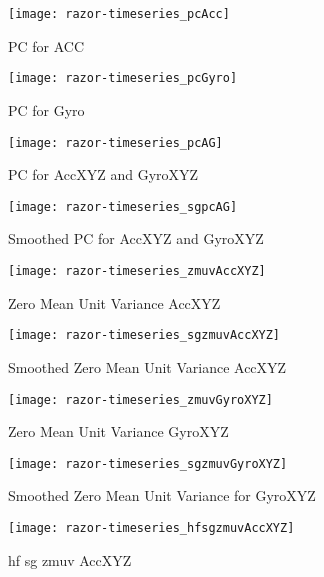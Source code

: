 \documentclass[a4paper,12pt]{article}
\begin{document}
\begin{figure}
\centering
\texttt{[image: razor-timeseries\_pcAcc]}
\caption{PC for ACC}
\end{figure}



\begin{figure}
\centering
\texttt{[image: razor-timeseries\_pcGyro]}
\caption{PC for Gyro}
\end{figure}



\begin{figure}
\centering
\texttt{[image: razor-timeseries\_pcAG]}
\caption{PC for AccXYZ and GyroXYZ}
\end{figure}

\begin{figure}
\centering
\texttt{[image: razor-timeseries\_sgpcAG]}
\caption{Smoothed PC for AccXYZ and GyroXYZ}
\end{figure}






\begin{figure}
\centering
\texttt{[image: razor-timeseries\_zmuvAccXYZ]}
\caption{Zero Mean Unit Variance AccXYZ}
\end{figure}


\begin{figure}
\centering
\texttt{[image: razor-timeseries\_sgzmuvAccXYZ]}
\caption{Smoothed Zero Mean Unit Variance AccXYZ}
\end{figure}







\begin{figure}
\centering
\texttt{[image: razor-timeseries\_zmuvGyroXYZ]}
\caption{Zero Mean Unit Variance GyroXYZ}
\end{figure}

\begin{figure}
\centering
\texttt{[image: razor-timeseries\_sgzmuvGyroXYZ]}
\caption{Smoothed Zero Mean Unit Variance for GyroXYZ}
\end{figure}






\begin{figure}
\centering
\texttt{[image: razor-timeseries\_hfsgzmuvAccXYZ]}
\caption{ hf sg zmuv AccXYZ}
\end{figure}
\end{document}
